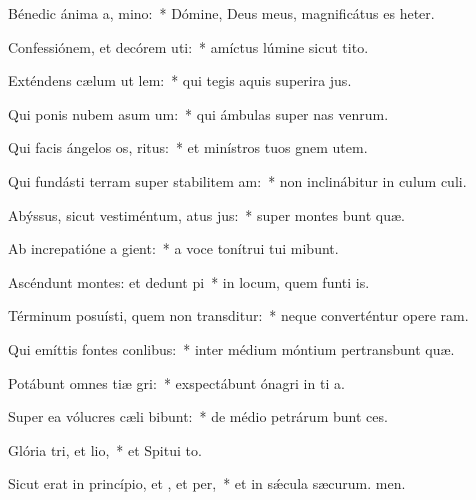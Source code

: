 \item Bénedic ánima a, mino:~* Dómine, Deus meus, magnificátus es heter.
\item Confessiónem, et decórem uti:~* amíctus lúmine sicut tito.
\item Exténdens cælum ut lem:~* qui tegis aquis superira jus.
\item Qui ponis nubem asum um:~* qui ámbulas super nas venrum.
\item Qui facis ángelos os, ritus:~* et minístros tuos gnem utem.
\item Qui fundásti terram super stabilitem am:~* non inclinábitur in culum culi.
\item Abýssus, sicut vestiméntum, atus jus:~* super montes bunt quæ.
\item Ab increpatióne a gient:~* a voce tonítrui tui mibunt.
\item Ascéndunt montes: et dedunt pi~* in locum, quem funti is.
\item Términum posuísti, quem non transditur:~* neque converténtur opere ram.
\item Qui emíttis fontes  conlibus:~* inter médium móntium pertransbunt quæ.
\item Potábunt omnes tiæ gri:~* exspectábunt ónagri in ti a.
\item Super ea vólucres cæli bibunt:~* de médio petrárum bunt ces.
\item Glória tri, et lio,~* et Spitui to.
\item Sicut erat in princípio, et , et per,~* et in sǽcula sæcurum. men.

